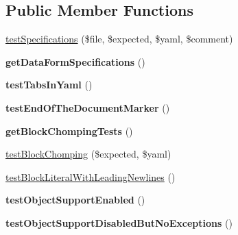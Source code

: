 \subsection*{Public Member Functions}
\begin{DoxyCompactItemize}
\item 
\hyperlink{classSymfony_1_1Component_1_1Yaml_1_1Tests_1_1ParserTest_ae53def0e735bb3a6685ecefe00ee7edb}{test\+Specifications} (\$file, \$expected, \$yaml, \$comment)
\item 
{\bfseries get\+Data\+Form\+Specifications} ()\hypertarget{classSymfony_1_1Component_1_1Yaml_1_1Tests_1_1ParserTest_a0873c1baf28d2c6511dba4393bf90366}{}\label{classSymfony_1_1Component_1_1Yaml_1_1Tests_1_1ParserTest_a0873c1baf28d2c6511dba4393bf90366}

\item 
{\bfseries test\+Tabs\+In\+Yaml} ()\hypertarget{classSymfony_1_1Component_1_1Yaml_1_1Tests_1_1ParserTest_a98e63bd752b99b81d1366c0b72249b67}{}\label{classSymfony_1_1Component_1_1Yaml_1_1Tests_1_1ParserTest_a98e63bd752b99b81d1366c0b72249b67}

\item 
{\bfseries test\+End\+Of\+The\+Document\+Marker} ()\hypertarget{classSymfony_1_1Component_1_1Yaml_1_1Tests_1_1ParserTest_ad2debfba1340e6b49784ba30a8d16f96}{}\label{classSymfony_1_1Component_1_1Yaml_1_1Tests_1_1ParserTest_ad2debfba1340e6b49784ba30a8d16f96}

\item 
{\bfseries get\+Block\+Chomping\+Tests} ()\hypertarget{classSymfony_1_1Component_1_1Yaml_1_1Tests_1_1ParserTest_a49a26786fe14ec798e095b542cf29ff3}{}\label{classSymfony_1_1Component_1_1Yaml_1_1Tests_1_1ParserTest_a49a26786fe14ec798e095b542cf29ff3}

\item 
\hyperlink{classSymfony_1_1Component_1_1Yaml_1_1Tests_1_1ParserTest_ac1f623fd99b33628574ff2a4b98dad87}{test\+Block\+Chomping} (\$expected, \$yaml)
\item 
\hyperlink{classSymfony_1_1Component_1_1Yaml_1_1Tests_1_1ParserTest_a85b15eff21cb2d19af709fdf212c43c9}{test\+Block\+Literal\+With\+Leading\+Newlines} ()
\item 
{\bfseries test\+Object\+Support\+Enabled} ()\hypertarget{classSymfony_1_1Component_1_1Yaml_1_1Tests_1_1ParserTest_a96e21da46f53adc3c9a21e98e1ba41a3}{}\label{classSymfony_1_1Component_1_1Yaml_1_1Tests_1_1ParserTest_a96e21da46f53adc3c9a21e98e1ba41a3}

\item 
{\bfseries test\+Object\+Support\+Disabled\+But\+No\+Exceptions} ()\hypertarget{classSymfony_1_1Component_1_1Yaml_1_1Tests_1_1ParserTest_a0c375facb9ac28cb52398adbc21471f5}{}\label{classSymfony_1_1Component_1_1Yaml_1_1Tests_1_1ParserTest_a0c375facb9ac28cb52398adbc21471f5}


\end{DoxyCompactItemize}
